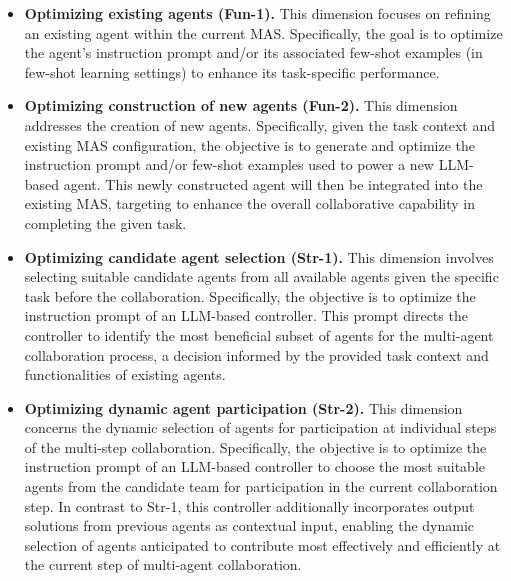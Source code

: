 \begin{itemize}[leftmargin=*]

    \item \noindent \textbf{Optimizing existing agents (Fun-1).} This dimension focuses on refining an existing agent within the current MAS. Specifically, the goal is to optimize the agent's instruction prompt and/or its associated few-shot examples (in few-shot learning settings) to enhance its task-specific performance.

    \item \noindent \textbf{Optimizing construction of new agents (Fun-2).} This dimension addresses the creation of new agents. Specifically, given the task context and existing MAS configuration, the objective is to generate and optimize the instruction prompt and/or few-shot examples used to power a new LLM-based agent. This newly constructed agent will then be integrated into the existing MAS, targeting to enhance the overall collaborative capability in completing the given task.



    \item \noindent \textbf{Optimizing candidate agent selection (Str-1).} This dimension involves selecting suitable candidate agents from all available agents given the specific task before the collaboration. %
    Specifically, the objective is to optimize the instruction prompt of an LLM-based controller. This prompt directs the controller to identify the most beneficial subset of agents for the multi-agent collaboration process, a decision informed by the provided task context and functionalities of existing agents.


    \item \noindent \textbf{Optimizing dynamic agent participation  (Str-2).} This dimension concerns the dynamic selection of agents for participation at individual steps of the multi-step collaboration. Specifically, the objective is to optimize the instruction prompt of an LLM-based controller to choose the most suitable agents from the candidate team for participation in the current collaboration step. In contrast to Str-1, this controller additionally incorporates output solutions from previous agents as contextual input, enabling the dynamic selection of agents anticipated to contribute most effectively and efficiently at the current step of multi-agent collaboration.



\end{itemize}
